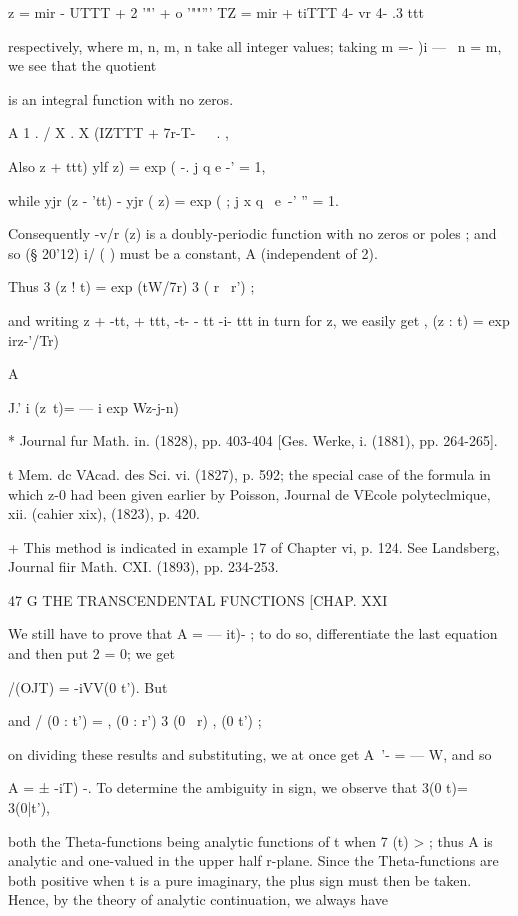 z = mir -  UTTT + 2 '"' + o '""''' TZ = mir + tiTTT 4-   vr 4- .3 ttt 

respectively, where m, n, m, n take all integer values; taking m =- )i — \, 
n = m, we see that the quotient 

is an integral function with no zeros. 

A 1 . / X . X (IZTTT + 7r-T-\ \  \  . , 

Also   z + ttt)  ylf z) = exp ( -. j  q  e -'  = 1, 

while yjr (z - 'tt) -  yjr ( z) = exp ( ; j x q~ e~-' '' = 1. 

Consequently -v/r (z) is a doubly-periodic function with no zeros or poles ; 
and so (§ 20'12) i/ ( ) must be a constant, A (independent of 2). 

Thus  3 (z ! t) = exp (tW/7r)  3 ( r \ r') ; 

and writing z +  -tt,   +   ttt,   -t- - tt -i-   ttt in turn for z, we easily get 
 , (z : t) = exp  irz-'/Tr) %

A%

J.' i (z\ t)= — i exp  Wz-j-n) %

* Journal fur Math. in. (1828), pp. 403-404 [Ges. Werke, i. (1881), pp. 264-265]. 

t Mem. dc VAcad. des Sci. vi. (1827), p. 592; the special case of the formula in which z-0 
had been given earlier by Poisson, Journal de VEcole polyteclmique, xii. (cahier xix), (1823), 
p. 420. 

+ This method is indicated in example 17 of Chapter vi, p. 124. See Landsberg, Journal fiir 
Math. CXI. (1893), pp. 234-253. 



47 G THE TRANSCENDENTAL FUNCTIONS [CHAP. XXI 

We still have to prove that A = — it)- ; to do so, differentiate the last 
equation and then put 2 = 0; we get 

 /(OJT) = -iVV(0 t'). 
But %

and  / (0 : t') =  , (0 : r')  3 (0 \ r)  , (0 t') ; 

on dividing these results and substituting, we at once get A~'- = — W, and so 

A = ± -iT) -. 
To determine the ambiguity in sign, we observe that 
 3(0 t)= 3(0|t'), 

both the Theta-functions being analytic functions of t when 7 (t) > ; 
thus A is analytic and one-valued in the upper half r-plane. Since the 
Theta-functions are both positive when t is a pure imaginary, the plus sign 
must then be taken. Hence, by the theory of analytic continuation, we 
always have 

